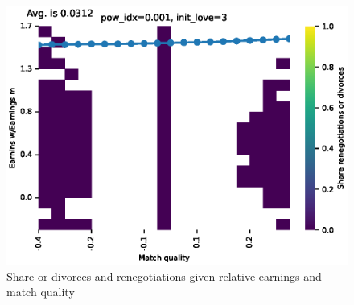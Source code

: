 \documentclass[]{article}
\begin{document}
\begin{figure}[H]
	\centering
	\includegraphics[width=\textwidth]{match_earn_ren_div.eps} 
	\caption{Share or divorces and renegotiations given relative earnings and match quality}
	\label{fig:surplus match earn}
\end{figure}


\end{document}
